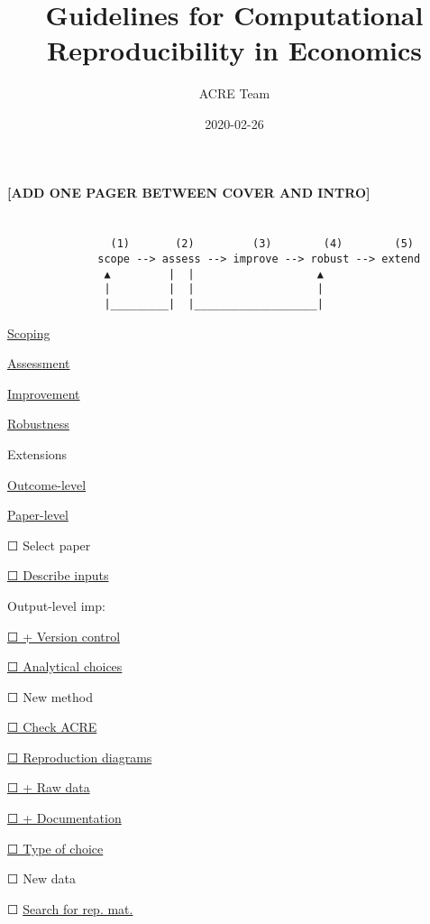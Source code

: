 \documentclass[]{book}
\title{Guidelines for Computational Reproducibility in Economics}
\author{ACRE Team}
\date{2020-02-26}
\begin{document}
\maketitle

{
\setcounter{tocdepth}{1}
\tableofcontents
}
\textbf{{[}ADD ONE PAGER BETWEEN COVER AND INTRO{]}}

\hypertarget{section}{%
\chapter*{}\label{section}}

\begin{verbatim}
                (1)       (2)         (3)        (4)        (5)
              scope --> assess --> improve --> robust --> extend
               ▲         |  |                   ▲
               |         |  |                   |
               |_________|  |___________________|
\end{verbatim}

\protect\hyperlink{scoping}{Scoping}

\protect\hyperlink{assessment}{Assessment}

\protect\hyperlink{improvements}{Improvement}

\protect\hyperlink{robust}{Robustness}

Extensions

\protect\hyperlink{improvements}{Outcome-level}

\protect\hyperlink{paper-level}{Paper-level}

☐ Select paper

\protect\hyperlink{describe-inputs}{☐ Describe inputs}

Output-level imp:

\protect\hyperlink{paper-level}{☐ + Version control}

\protect\hyperlink{id-analy}{☐ Analytical choices}

☐ New method

\protect\hyperlink{check-acre}{☐ Check ACRE}

\protect\hyperlink{diagram}{☐ Reproduction diagrams}

\protect\hyperlink{rd}{☐ + Raw data}

\protect\hyperlink{paper-level}{☐ + Documentation}

\protect\hyperlink{id-type}{☐ Type of choice}

☐ New data

☐ \protect\hyperlink{verify-rep-mat}{Search for rep. mat.}
\end{document}
